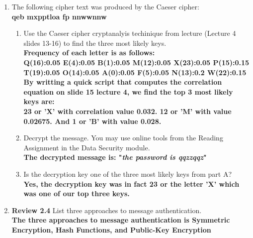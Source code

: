 \documentclass[12pt]{article}
\begin{document}
\renewcommand{\headrulewidth}{0.4pt}
\vspace{-3mm}
\begin{enumerate}
\item {The following cipher text was produced by the Caeser cipher: \\ \textbf{qeb mxpptloa fp nnwwnnw}}
  \begin{enumerate}
  \item {Use the Caeser cipher cryptanalyis techinique from lecture (Lecture 4 slides 13-16) to find the three most likely keys.} \\
    \textbf{Frequency of each letter is as follows: } \\
    \textbf{Q(16):0.05 E(4):0.05 B(1):0.05 M(12):0.05 X(23):0.05 P(15):0.15 \\ T(19):0.05 O(14):0.05 A(0):0.05 F(5):0.05 N(13):0.2 W(22):0.15 } \\

    \textbf{By writting a quick script that computes the correlation equation on slide 15 lecture 4, we find the top 3 most likely keys are: } \\
    \textbf{23 or 'X' with correlation value 0.032. 12 or 'M' with value 0.02675. And 1 or 'B' with value 0.028.}
  \item {Decrypt the message. You may use online tools from the Reading Assignment in the Data Security module.} \\

  \textbf{The decrypted message is: "\textit{the password is qqzzqqz}"} \\

  \item {Is the decryption key one of the three most likely keys from part A?} \\

  \textbf{Yes, the decryption key was in fact 23 or the letter 'X' which was one of our top three keys.}
  \end{enumerate}
\vspace{10pt}
\item {\textbf{Review 2.4} List three approaches to message authentication. } \\

\textbf{The three approaches to message authentication is Symmetric Encryption, Hash Functions, and Public-Key Encryption}


\end{enumerate}
\end{document}

